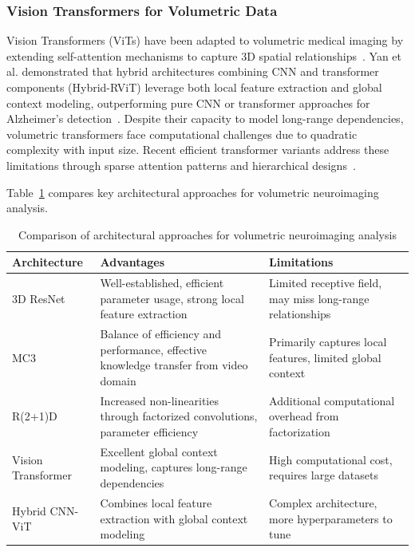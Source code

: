\documentclass[12pt, a4paper]{article}
\begin{document}
\subsubsection{Vision Transformers for Volumetric Data}

Vision Transformers (ViTs) have been adapted to volumetric medical imaging by extending self-attention mechanisms to capture 3D spatial relationships~\cite{lyu2022classification}. Yan et al. demonstrated that hybrid architectures combining CNN and transformer components (Hybrid-RViT) leverage both local feature extraction and global context modeling, outperforming pure CNN or transformer approaches for Alzheimer's detection~\cite{yan2025hybrid}. Despite their capacity to model long-range dependencies, volumetric transformers face computational challenges due to quadratic complexity with input size. Recent efficient transformer variants address these limitations through sparse attention patterns and hierarchical designs~\cite{lu2025efficient}.

Table~\ref{tab:architecture_comparison} compares key architectural approaches for volumetric neuroimaging analysis.

\begin{table}[htbp]
\centering
\begin{tabular}{|p{3cm}|p{5cm}|p{5cm}|}
\hline
\textbf{Architecture} & \textbf{Advantages} & \textbf{Limitations} \\
\hline
3D ResNet & Well-established, efficient parameter usage, strong local feature extraction & Limited receptive field, may miss long-range relationships \\
\hline
MC3 & Balance of efficiency and performance, effective knowledge transfer from video domain & Primarily captures local features, limited global context \\
\hline
R(2+1)D & Increased non-linearities through factorized convolutions, parameter efficiency & Additional computational overhead from factorization \\
\hline
Vision Transformer & Excellent global context modeling, captures long-range dependencies & High computational cost, requires large datasets \\
\hline
Hybrid CNN-ViT & Combines local feature extraction with global context modeling & Complex architecture, more hyperparameters to tune \\
\hline
\end{tabular}
\caption{Comparison of architectural approaches for volumetric neuroimaging analysis}
\label{tab:architecture_comparison}
\end{table}
\end{document}
